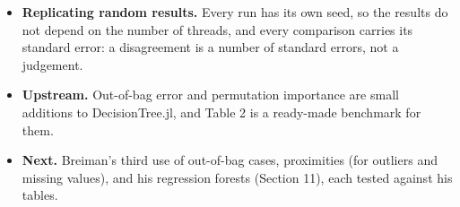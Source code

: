 \begin{itemize}
  \item \textbf{Replicating random results.} Every run has its own seed, so the results do not depend on the number of
    threads, and every comparison carries its standard error: a disagreement is a number of standard errors, not a judgement.
  \item \textbf{Upstream.} Out-of-bag error and permutation importance are small additions to DecisionTree.jl, and Table 2
    is a ready-made benchmark for them.
  \item \textbf{Next.} Breiman's third use of out-of-bag cases, proximities (for outliers and missing values), and his
    regression forests (Section 11), each tested against his tables.
\end{itemize}

{\footnotesize
{}
}

\nmcredit

